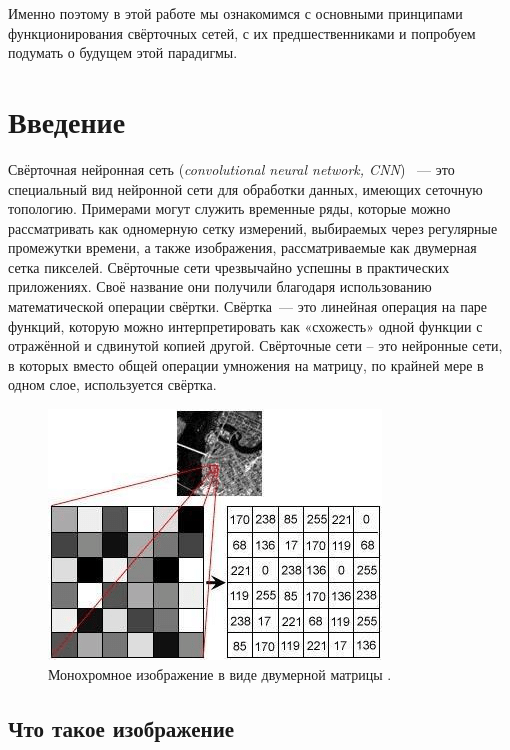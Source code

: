 \documentclass[12pt, fleqn]{article}
\begin{document}
    Именно поэтому в этой работе мы ознакомимся с основными принципами функционирования свёрточных сетей, с их предшественниками и 
    попробуем подумать о будущем этой парадигмы.

    \newpage

    \newpage
        \tableofcontents
    \newpage

    \section{Введение}

    Свёрточная нейронная сеть (\textit{convolutional neural network, CNN}) \cite{LeCun1989}~--- это специальный вид 
    нейронной сети для 
    обработки данных, имеющих сеточную топологию. Примерами могут служить временные ряды, которые можно рассматривать как одномерную 
    сетку измерений, выбираемых через регулярные промежутки времени, а также изображения, рассматриваемые как двумерная сетка пикселей. 
    Свёрточные сети чрезвычайно успешны в практических приложениях. Своё название они получили благодаря использованию математической 
    операции свёртки. Свёртка~--- это линейная операция на паре функций, которую можно интерпретировать как «схожесть» одной 
    функции с отражённой и сдвинутой копией другой. Свёрточные сети – это нейронные сети, в которых вместо общей 
    операции умножения на матрицу, по крайней мере в одном слое, используется свёртка.

    \begin{figure}[ht]
        \centering
        \includegraphics[scale=0.5]{pics/image_representation.png}
        \caption{Монохромное изображение в виде двумерной матрицы \cite{imageRepr}.}
        \label{image_representation}
    \end{figure}

    \subsection{Что такое изображение}
\end{document}
